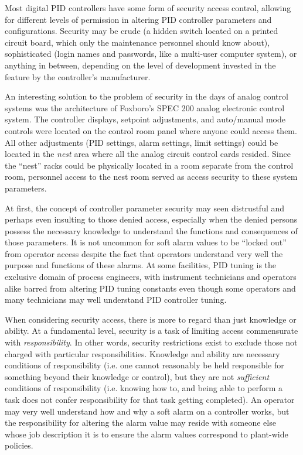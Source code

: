 Most digital PID controllers have some form of security access control, allowing for different levels of permission in altering PID controller parameters and configurations.  Security may be crude (a hidden switch located on a printed circuit board, which only the maintenance personnel should know about), sophisticated (login names and passwords, like a multi-user computer system), or anything in between, depending on the level of development invested in the feature by the controller's manufacturer.

An interesting solution to the problem of security in the days of analog control systems was the architecture of Foxboro's SPEC 200 analog electronic control system.  The controller displays, setpoint adjustments, and auto/manual mode controls were located on the control room panel where anyone could access them.  All other adjustments (PID settings, alarm settings, limit settings) could be located in the \textit{nest} area where all the analog circuit control cards resided.  Since the ``nest'' racks could be physically located in a room separate from the control room, personnel access to the nest room served as access security to these system parameters.    

\vskip 10pt

At first, the concept of controller parameter security may seen distrustful and perhaps even insulting to those denied access, especially when the denied persons possess the necessary knowledge to understand the functions and consequences of those parameters.  It is not uncommon for soft alarm values to be ``locked out'' from operator access despite the fact that operators understand very well the purpose and functions of these alarms.  At some facilities, PID tuning is the exclusive domain of process engineers, with instrument technicians and operators alike barred from altering PID tuning constants even though some operators and many technicians may well understand PID controller tuning.

When considering security access, there is more to regard than just knowledge or ability.  At a fundamental level, security is a task of limiting access commensurate with \textit{responsibility}.  In other words, security restrictions exist to exclude those not charged with particular responsibilities.  Knowledge and ability are necessary conditions of responsibility (i.e. one cannot reasonably be held responsible for something beyond their knowledge or control), but they are not \textit{sufficient} conditions of responsibility (i.e. knowing how to, and being able to perform a task does not confer responsibility for that task getting completed).  An operator may very well understand how and why a soft alarm on a controller works, but the responsibility for altering the alarm value may reside with someone else whose job description it is to ensure the alarm values correspond to plant-wide policies.








